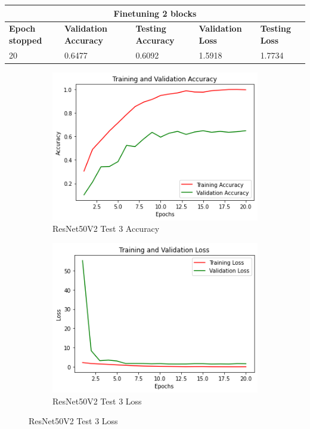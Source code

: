 \medskip

\begin{tabular}{ |p{2cm}|p{2cm}|p{2cm}|p{2cm}|p{2cm}|  }
\hline
\multicolumn{5}{|c|}{Finetuning 2 blocks} \\
\hline
\textbf{Epoch stopped} & \textbf{Validation Accuracy} & \textbf{Testing Accuracy} & \textbf{Validation Loss} & \textbf{Testing Loss} \\
\hline
20 & 0.6477 & 0.6092 & 1.5918 & 1.7734\\
\hline
\end{tabular}

\begin{figure}[H]
	\begin{subfigure}{0.5\textwidth}
		\includegraphics[width=0.9\linewidth]{img/resnet50v2/resnet50finetuned2acc.png} 
		\caption{ResNet50V2 Test 3 Accuracy}
		\label{fig:resnet50finetuned2acc}
	\end{subfigure}
	\begin{subfigure}{0.5\textwidth}
		\includegraphics[width=0.9\linewidth]{img/resnet50v2/resnet50finetuned2loss.png}
		\caption{ResNet50V2 Test 3 Loss}
		\label{fig:resnet50finetuned2loss}
	\end{subfigure}
\end{figure}

